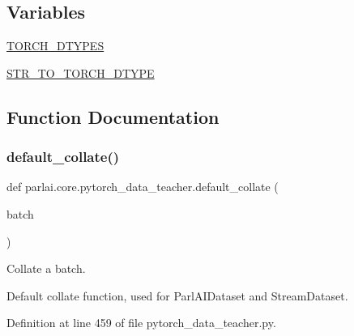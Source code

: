 \subsection*{Variables}
\begin{DoxyCompactItemize}
\item 
\hyperlink{namespaceparlai_1_1core_1_1pytorch__data__teacher_abc38cc19f3e02fbe610e5b5cd2de0b2c}{T\+O\+R\+C\+H\+\_\+\+D\+T\+Y\+P\+ES}
\item 
\hyperlink{namespaceparlai_1_1core_1_1pytorch__data__teacher_a8a64b1f3378f7698020472b7e968cc8b}{S\+T\+R\+\_\+\+T\+O\+\_\+\+T\+O\+R\+C\+H\+\_\+\+D\+T\+Y\+PE}
\end{DoxyCompactItemize}


\subsection{Function Documentation}
\mbox{\label{namespaceparlai_1_1core_1_1pytorch__data__teacher_a7236aa20497f2a598df9b85909901184}} 
\subsubsection{\texorpdfstring{default\+\_\+collate()}{default\_collate()}}
{\footnotesize\ttfamily def parlai.\+core.\+pytorch\+\_\+data\+\_\+teacher.\+default\+\_\+collate (\begin{DoxyParamCaption}\item[{}]{batch }\end{DoxyParamCaption})}

\begin{DoxyVerb}Collate a batch.

Default collate function, used for ParlAIDataset and StreamDataset.
\end{DoxyVerb}
 

Definition at line 459 of file pytorch\+\_\+data\+\_\+teacher.\+py.


